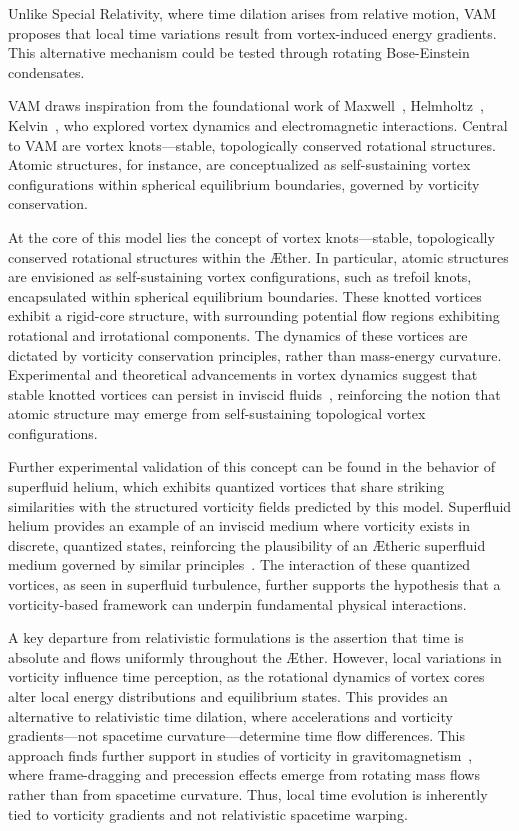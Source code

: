 Unlike Special Relativity, where time dilation arises from relative motion, VAM proposes that local time variations result from vortex-induced energy gradients. This alternative mechanism could be tested through rotating Bose-Einstein condensates.

VAM draws inspiration from the foundational work of Maxwell~\cite{maxwell1861}, Helmholtz~\cite{helmholtz1858}, Kelvin~\cite{kelvin1867}, who explored vortex dynamics and electromagnetic interactions. Central to VAM are vortex knots—stable, topologically conserved rotational structures. Atomic structures, for instance, are conceptualized as self-sustaining vortex configurations within spherical equilibrium boundaries, governed by vorticity conservation.

At the core of this model lies the concept of vortex knots—stable, topologically conserved rotational structures within the Æther. In particular, atomic structures are envisioned as self-sustaining vortex configurations, such as trefoil knots, encapsulated within spherical equilibrium boundaries. These knotted vortices exhibit a rigid-core structure, with surrounding potential flow regions exhibiting rotational and irrotational components. The dynamics of these vortices are dictated by vorticity conservation principles, rather than mass-energy curvature. Experimental and theoretical advancements in vortex dynamics suggest that stable knotted vortices can persist in inviscid fluids~\cite{kleckner2013}, reinforcing the notion that atomic structure may emerge from self-sustaining topological vortex configurations.

Further experimental validation of this concept can be found in the behavior of superfluid helium, which exhibits quantized vortices that share striking similarities with the structured vorticity fields predicted by this model. Superfluid helium provides an example of an inviscid medium where vorticity exists in discrete, quantized states, reinforcing the plausibility of an Ætheric superfluid medium governed by similar principles~\cite{vinen2002}. The interaction of these quantized vortices, as seen in superfluid turbulence, further supports the hypothesis that a vorticity-based framework can underpin fundamental physical interactions.

A key departure from relativistic formulations is the assertion that time is absolute and flows uniformly throughout the Æther. However, local variations in vorticity influence time perception, as the rotational dynamics of vortex cores alter local energy distributions and equilibrium states. This provides an alternative to relativistic time dilation, where accelerations and vorticity gradients—not spacetime curvature—determine time flow differences. This approach finds further support in studies of vorticity in gravitomagnetism~\cite{cahill2005}, where frame-dragging and precession effects emerge from rotating mass flows rather than from spacetime curvature. Thus, local time evolution is inherently tied to vorticity gradients and not relativistic spacetime warping.

